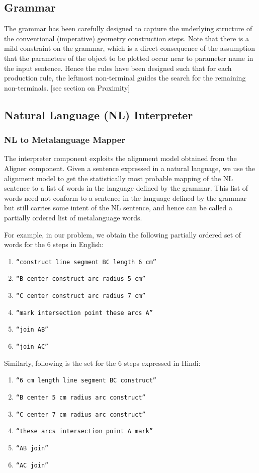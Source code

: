 \def\DevnagVersion{2.15}\documentclass[12pt]{article}
\begin{document}
\subsection{Grammar}
The grammar has been carefully designed to capture the underlying structure of the conventional (imperative) geometry construction steps. Note that there is a mild constraint on the grammar, which is a direct consequence of the assumption that the parameters of the object to be plotted occur near to parameter name in the input sentence. Hence the rules have been designed such that for each production rule, the leftmost non-terminal guides the search for the remaining non-terminals. [see section on Proximity]

\subsection{Natural Language (NL) Interpreter}

\subsubsection{NL to Metalanguage Mapper}
The interpreter component exploits the alignment model obtained from the Aligner component. Given a sentence expressed in a natural language, we use the alignment model to get the statistically most probable mapping of the NL sentence to a list of words in the language defined by the grammar. This list of words need not conform to a sentence in the language defined by the grammar but still carries some intent of the NL sentence, and hence can be called a partially ordered list of metalanguage words.

For example, in our problem, we obtain the following partially ordered set of words for the 6 steps in English:

\begin{enumerate}
\item \texttt{``construct line segment BC length 6 cm''}
\item \texttt{``B center construct arc radius 5 cm''}
\item \texttt{``C center construct arc radius 7 cm''}
\item \texttt{``mark intersection point these arcs A''}
\item \texttt{``join AB''}
\item \texttt{``join AC''}
\end{enumerate}

Similarly, following is the set for the 6 steps expressed in Hindi:
\begin{enumerate}
\item \texttt{``6 cm length line segment BC construct''}
\item \texttt{``B center 5 cm radius arc construct''}
\item \texttt{``C center 7 cm radius arc construct''}
\item \texttt{``these arcs intersection point A mark''}
\item \texttt{``AB join''}
\item \texttt{``AC join''}
\end{enumerate}
\end{document}

